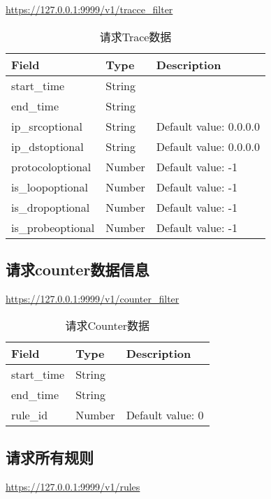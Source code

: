\url{https://127.0.0.1:9999/v1/tracce_filter}

\begin{table}[]
    \centering
    \caption{请求Trace数据}
    \label{tbl:get_trace}
    \begin{tabular}{lll}
    Field             & Type   & Description            \\ \hline
    start\_time       & String &                        \\
    end\_time         & String &                        \\
    ip\_srcoptional   & String & Default value: 0.0.0.0 \\
    ip\_dstoptional   & String & Default value: 0.0.0.0 \\
    protocoloptional  & Number & Default value: -1      \\
    is\_loopoptional  & Number & Default value: -1      \\
    is\_dropoptional  & Number & Default value: -1      \\
    is\_probeoptional & Number & Default value: -1      \\ \hline
    \end{tabular}
\end{table}

\subsection{请求counter数据信息}

\url{https://127.0.0.1:9999/v1/counter_filter}

\begin{table}[]
    \centering
    \caption{请求Counter数据}
    \label{tbl:get_counter}
    \begin{tabular}{lll}
    Field       & Type   & Description      \\ \hline
    start\_time & String &                  \\
    end\_time   & String &                  \\
    rule\_id    & Number & Default value: 0 \\ \hline
    \end{tabular}
\end{table}

\subsection{请求所有规则}

\url{https://127.0.0.1:9999/v1/rules}


